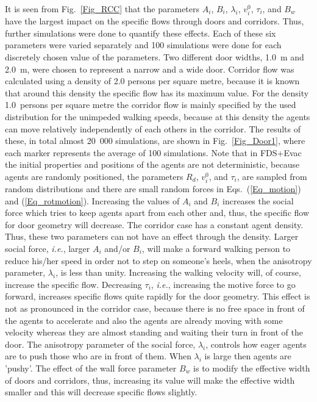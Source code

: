\documentclass[12pt,a4paper,final,twoside]{stylevk}
\begin{document}
It is seen from Fig.~\ref{Fig_RCC} that the parameters $A_i$, $B_i$,
$\lambda_i$, $v^0_i$, $\tau_i$, and $B_w$ have the largest impact on
the specific flows through doors and corridors. Thus, further
simulations were done to quantify these effects. Each of these six
parameters were varied separately and 100 simulations were done for
each discretely chosen value of the parameters.  Two different door
widths, 1.0~m and 2.0~m, were chosen to represent a narrow and a wide
door.  Corridor flow was calculated using a density of 2.0 persons per
square metre, because it is known that around this density the
specific flow has its maximum value.  For the density 1.0~persons per
square metre the corridor flow is mainly specified by the used
distribution for the unimpeded walking speeds, because at this density
the agents can move relatively independently of each others in the
corridor.  The results of these, in total almost 20~000 simulations,
are shown in Fig.~\ref{Fig_Door1}, where each marker represents the
average of 100 simulations.  Note that in FDS+Evac the initial
properties and positions of the agents are not deterministic, because
agents are randomly positioned, the parameters $R_d$, $v^0_i$, and
$\tau_i$, are sampled from random distributions and there are small
random forces in Eqs.~(\ref{Eq_motion}) and (\ref{Eq_rotmotion}).
Increasing the values of $A_i$ and $B_i$ increases the social force
which tries to keep agents apart from each other and, thus, the
specific flow for door geometry will decrease.  The corridor case has
a constant agent density.  Thus, these two parameters can not have an
effect through the density.  Larger social force, \emph{i.e.}, larger
$A_i$ and/or $B_i$, will make a forward walking person to reduce
his/her speed in order not to step on someone's heels, when the
anisotropy parameter, $\lambda_i$, is less than unity.  Increasing the
walking velocity will, of course, increase the specific flow.
Decreasing $\tau_i$, \emph{i.e.}, increasing the motive force to go
forward, increases specific flows quite rapidly for the door geometry.
This effect is not as pronounced in the corridor case, because there
is no free space in front of the agents to accelerate and also the
agents are already moving with some velocity whereas they are almost
standing and waiting their turn in front of the door.  The anisotropy
parameter of the social force, $\lambda_i$, controls how eager agents
are to push those who are in front of them.  When $\lambda_i$ is large
then agents are 'pushy'.  The effect of the wall force parameter $B_w$
is to modify the effective width of doors and corridors, thus,
increasing its value will make the effective width smaller and this
will decrease specific flows slightly.
\end{document}
